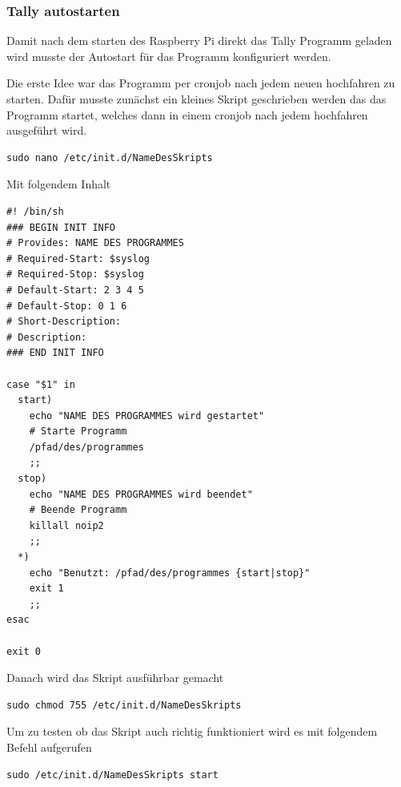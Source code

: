 \documentclass[11pt,a4paper]{article} %
\begin{document}
\subsubsection{Tally autostarten}
Damit nach dem starten des Raspberry Pi direkt das Tally Programm geladen wird musste der Autostart f\"ur das Programm konfiguriert werden.
\par
Die erste Idee war das Programm per cronjob nach jedem neuen hochfahren zu starten. Daf\"ur musste zun\"achst ein kleines Skript geschrieben werden das das Programm startet, welches dann in einem cronjob nach jedem hochfahren ausgef\"uhrt wird.
\begin{frame}

\begin{lstlisting}
sudo nano /etc/init.d/NameDesSkripts
\end{lstlisting}
\end{frame}
\newpage
Mit folgendem Inhalt
\begin{frame}

\begin{lstlisting}
#! /bin/sh
### BEGIN INIT INFO
# Provides: NAME DES PROGRAMMES
# Required-Start: $syslog
# Required-Stop: $syslog
# Default-Start: 2 3 4 5
# Default-Stop: 0 1 6
# Short-Description:
# Description:
### END INIT INFO
 
case "$1" in
  start)
    echo "NAME DES PROGRAMMES wird gestartet"
    # Starte Programm
    /pfad/des/programmes
    ;;
  stop)
    echo "NAME DES PROGRAMMES wird beendet"
    # Beende Programm
    killall noip2
    ;;
  *)
    echo "Benutzt: /pfad/des/programmes {start|stop}"
    exit 1
    ;;
esac
 
exit 0
\end{lstlisting}
\end{frame}

Danach wird das Skript ausf\"uhrbar gemacht
\begin{frame}

\begin{lstlisting}
sudo chmod 755 /etc/init.d/NameDesSkripts
\end{lstlisting}
\end{frame}
Um zu testen ob das Skript auch richtig funktioniert wird es mit folgendem Befehl aufgerufen
\begin{frame}

\begin{lstlisting}
sudo /etc/init.d/NameDesSkripts start
\end{lstlisting}
\end{frame}
\end{document}

